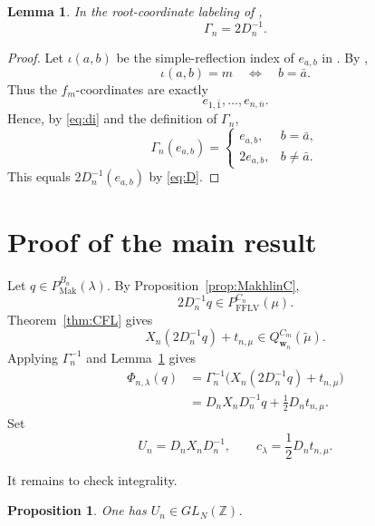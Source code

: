 \documentclass[a4paper, 12pt]{amsart}
\newtheorem{proposition}[theorem]{Proposition}
\newtheorem{lemma}[theorem]{Lemma}
\newcommand{\FFLV}{\mathrm{FFLV}}
\newcommand{\Mak}{\mathrm{Mak}}
\newcommand{\ZZ}{\mathbb Z}
\newcommand{\ww}{\mathbf w}
\begin{document}
\begin{lemma}\label{lem:GammaD}
In the root-coordinate labeling of \cite[Section~4]{CFL24},
\[
                           \Gamma_n=2D_n^{-1}.
\]
\end{lemma}

\begin{proof}
Let $\iota(a,b)$ be the simple-reflection index of $e_{a,b}$ in \cite{CFL24}. By \cite[Notation~4.10]{CFL24},
\[
                   \iota(a,b)=m
                   \quad\Longleftrightarrow\quad
                   b=\bar a.
\]
Thus the $f_m$-coordinates are exactly
\[
                   e_{1,\bar1},\ldots,e_{n,\bar n}.
\]
Hence, by \eqref{eq:di} and the definition of $\Gamma_n$,
\[
 \Gamma_n(e_{a,b})=
 \begin{cases}
   e_{a,b},&b=\bar a,\\
   2e_{a,b},&b\neq\bar a.
 \end{cases}
\]
This equals $2D_n^{-1}(e_{a,b})$ by \eqref{eq:D}.
\end{proof}

\section{Proof of the main result}\label{sec:proof}

Let $q\in P_{\Mak}^{B_n}(\lambda)$. By Proposition~\ref{prop:MakhlinC},
\[
                   2D_n^{-1}q\in P_{\FFLV}^{C_n}(\mu).
\]
Theorem~\ref{thm:CFL} gives
\[
       X_n(2D_n^{-1}q)+t_{n,\mu}
          \in Q_{\ww_n}^{C_m}(\widetilde\mu).
\]
Applying $\Gamma_n^{-1}$ and Lemma~\ref{lem:GammaD} gives
\begin{equation}\label{eq:Phi}
 \begin{split}
 \Phi_{n,\lambda}(q)
 &=\Gamma_n^{-1}\bigl(X_n(2D_n^{-1}q)+t_{n,\mu}\bigr)\\
 &=D_nX_nD_n^{-1}q+\frac12D_nt_{n,\mu}.
 \end{split}
\end{equation}
Set
\begin{equation}\label{eq:Uc}
              U_n=D_nX_nD_n^{-1},
       \qquad c_\lambda=\frac12D_nt_{n,\mu}.
\end{equation}

It remains to check integrality.

\begin{proposition}\label{prop:U}
One has $U_n\in GL_N(\ZZ)$.
\end{proposition}
\end{document}
